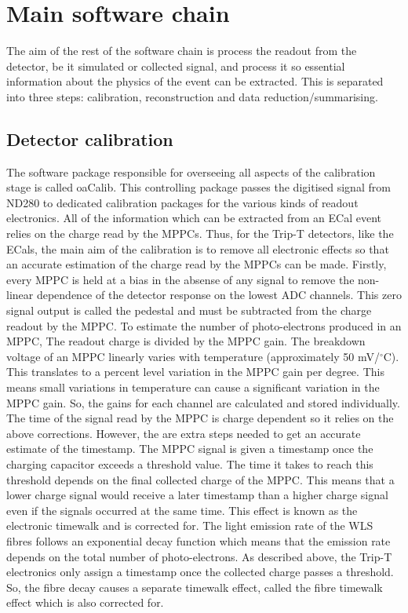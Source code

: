 \section{Main software chain}
\label{sec:mainchain}
The aim of the rest of the software chain is process the readout from the detector, be it simulated or collected signal, and process it so essential information about the physics of the event can be extracted.  This is separated into three steps: calibration, reconstruction and data reduction/summarising.


\subsection{Detector calibration}
\label{subsec:DetectorCalibration}
The software package responsible for overseeing all aspects of the calibration stage is called oaCalib.  This controlling package passes the digitised signal from ND280 to dedicated calibration packages for the various kinds of readout electronics.  All of the information which can be extracted from an ECal event relies on the charge read by the MPPCs.  Thus, for the Trip-T detectors, like the ECals, the main aim of the calibration is to remove all electronic effects so that an accurate estimation of the charge read by the MPPCs can be made.  
\newline
Firstly, every MPPC is held at a bias in the absense of any signal to remove the non-linear dependence of the detector response on the lowest ADC channels.  This zero signal output is called the pedestal and must be subtracted from the charge readout by the MPPC.  
\newline
To estimate the number of photo-electrons produced in an MPPC, The readout charge is divided by the MPPC gain.  The breakdown voltage of an MPPC linearly varies with temperature (approximately 50 mV/$^\circ$C).  This translates to a percent level variation in the MPPC gain per degree.  This means small variations in temperature can cause a significant variation in the MPPC gain.  So, the gains for each channel are calculated and stored individually.
\newline
The time of the signal read by the MPPC is charge dependent so it relies on the above corrections.  However, the are extra steps needed to get an accurate estimate of the timestamp.  The MPPC signal is given a timestamp once the charging capacitor exceeds a threshold value.  The time it takes to reach this threshold depends on the final collected charge of the MPPC.  This means that a lower charge signal would receive a later timestamp than a higher charge signal even if the signals occurred at the same time.  This effect is known as the electronic timewalk and is corrected for.
\newline
\newline
The light emission rate of the WLS fibres follows an exponential decay function which means that the emission rate depends on the total number of photo-electrons.  As described above, the Trip-T electronics only assign a timestamp once the collected charge passes a threshold.  So, the fibre decay causes a separate timewalk effect, called the fibre timewalk effect which is also corrected for.  
